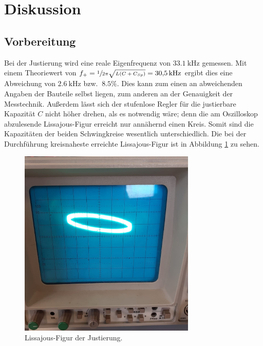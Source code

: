 \section{Diskussion}
\label{sec:Diskussion}

\subsection{Vorbereitung}
Bei der Justierung wird eine reale Eigenfrequenz von $\SI{33.1}{\kilo\hertz}$ gemessen. Mit einem Theoriewert von $f_+ = \sfrac{1}{2\pi\sqrt{L(C+C_{Sp})}} = \SI{30.5}{\kilo\hertz}$ ergibt dies eine
Abweichung von $\SI{2.6}{\kilo\hertz}$ bzw. $~8.5\%$.
Dies kann zum einen an abweichenden Angaben der Bauteile selbst liegen, %
zum anderen an der Genauigkeit der Messtechnik. Außerdem lässt sich der stufenlose Regler für die justierbare Kapazität $C$
nicht höher drehen, als es notwendig wäre; denn die am Oszilloskop abzulesende Lissajous-Figur erreicht nur annähernd einen Kreis. Somit sind die Kapazitäten der beiden 
Schwingkreise wesentlich unterschiedlich. Die bei der Durchführung kreisnaheste erreichte Lissajous-Figur ist in Abbildung \ref{fig:Lissajous} zu sehen.

\begin{figure}
    \centering
    \includegraphics[width=0.75\textwidth]{plots/Lissajous_90Grad.jpeg}
    \caption{Lissajous-Figur der Justierung.}
    \label{fig:Lissajous}
\end{figure}

